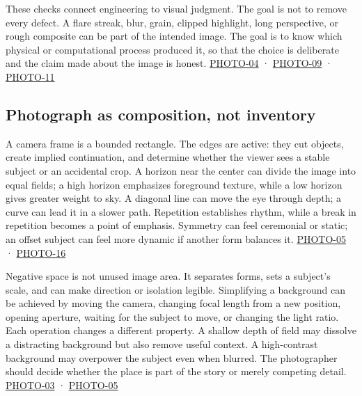 These checks connect engineering to visual judgment. The goal is not to remove every defect. A flare streak, blur, grain, clipped highlight, long perspective, or rough composite can be part of the intended image. The goal is to know which physical or computational process produced it, so that the choice is deliberate and the claim made about the image is honest. \hyperref[04-visual-computing-ii-ch036-photo-04---photography-session-04]{PHOTO-04} · \hyperref[04-visual-computing-ii-ch036-photo-09---photography-session-09]{PHOTO-09} · \hyperref[04-visual-computing-ii-ch036-photo-11---photography-session-11]{PHOTO-11}

\subsection{Photograph as composition, not inventory}\label{04-visual-computing-ii-ch034-photograph-as-composition-not-inventory}

\hypertarget{04-visual-computing-ii-ch034-photograph-as-composition-not-inventory}{}

A camera frame is a bounded rectangle. The edges are active: they cut objects, create implied continuation, and determine whether the viewer sees a stable subject or an accidental crop. A horizon near the center can divide the image into equal fields; a high horizon emphasizes foreground texture, while a low horizon gives greater weight to sky. A diagonal line can move the eye through depth; a curve can lead it in a slower path. Repetition establishes rhythm, while a break in repetition becomes a point of emphasis. Symmetry can feel ceremonial or static; an offset subject can feel more dynamic if another form balances it. \hyperref[04-visual-computing-ii-ch036-photo-05---photography-session-05]{PHOTO-05} · \hyperref[04-visual-computing-ii-ch036-photo-16---photography-session-16]{PHOTO-16}

Negative space is not unused image area. It separates forms, sets a subject's scale, and can make direction or isolation legible. Simplifying a background can be achieved by moving the camera, changing focal length from a new position, opening aperture, waiting for the subject to move, or changing the light ratio. Each operation changes a different property. A shallow depth of field may dissolve a distracting background but also remove useful context. A high-contrast background may overpower the subject even when blurred. The photographer should decide whether the place is part of the story or merely competing detail. \hyperref[04-visual-computing-ii-ch036-photo-03---photography-session-03]{PHOTO-03} · \hyperref[04-visual-computing-ii-ch036-photo-05---photography-session-05]{PHOTO-05}

